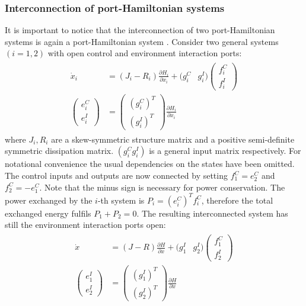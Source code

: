 \documentclass[a4paper,twoside, openright,12pt]{report}
\begin{document}
\subsubsection{Interconnection of port-Hamiltonian systems}
It is important to notice that the interconnection of two port-Hamiltonian systems is again a port-Hamiltonian system \cite{Schaft_14}. Consider two general systems $(i=1,2)$ with open control and environment interaction ports:
\begin{eqnarray}
\begin{aligned}
	\dot{x}_i &= (J_i - R_i)\frac{\partial H_i}{\partial x_i}+ (g_i^C & g_i^I)\begin{pmatrix}f_i^C \\ f_i^I\end{pmatrix}\\
	\begin{pmatrix}e_i^C \\ e_i^I\end{pmatrix} &= \begin{pmatrix}(g_i^C)^T \\ (g_i^I)^T\end{pmatrix}\frac{\partial H_i}{\partial x_i}
\end{aligned}
\end{eqnarray}
where $J_i,R_i$ are a skew-symmetric structure matrix and a positive semi-definite symmetric dissipation matrix. $(g_i^C g_i^I)$ is a general input matrix respectively.
For notational convenience the usual dependencies on the states have been omitted. The control inputs and outputs are now connected by setting $f_1^C = e_2^C $ and $ f_2^C = -e_1^C $. Note that the minus sign is necessary for power conservation. The power exchanged by the $i$-th system is $P_i = (e_i^C)^Tf_i^C$, therefore the total exchanged energy fulfils $ P_1 + P_2 = 0 $. The resulting interconnected system has still the environment interaction ports open:
\begin{eqnarray}
\begin{aligned}
	\dot{x} &= (J - R)\frac{\partial H}{\partial x}+ (g_1^I & g_2^I)\begin{pmatrix}f_1^C \\ f_2^I\end{pmatrix}\\
	\begin{pmatrix}e_1^I \\ e_2^I\end{pmatrix} &= \begin{pmatrix}(g_1^I)^T \\ (g_2^I)^T\end{pmatrix}\frac{\partial H}{\partial x}
\end{aligned}
\end{eqnarray}
\end{document}
